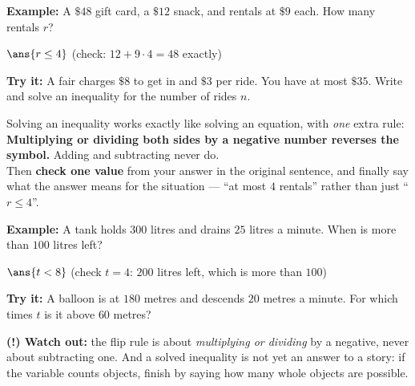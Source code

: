 \documentclass[12pt]{article}
\begin{document}
\begin{examplebox}
\textbf{Example:} \quad A $\$48$ gift card, a $\$12$ snack, and rentals at
$\$9$ each. How many rentals $r$?

$\ans{r \le 4}$ \quad (check: $12 + 9 \cdot 4 = 48$ exactly)
\end{examplebox}

\begin{tryitbox}
\textbf{Try it:} \quad A fair charges $\$8$ to get in and $\$3$ per ride. You
have at most $\$35$. Write and solve an inequality for the number of rides
$n$.\\[2pt]
\end{tryitbox}


\begin{formulabox}
Solving an inequality works exactly like solving an equation, with \emph{one}
extra rule:\\[3pt]
\textbf{Multiplying or dividing both sides by a negative number reverses the
symbol.} Adding and subtracting never do.\\[3pt]
Then \textbf{check one value} from your answer in the original sentence, and
finally say what the answer means for the situation --- ``at most $4$ rentals''
rather than just ``$r \le 4$''.
\end{formulabox}

\begin{examplebox}
\textbf{Example:} \quad A tank holds $300$ litres and drains $25$ litres a
minute. When is more than $100$ litres left?

$\ans{t < 8}$ \quad (check $t = 4$: $200$ litres left, which is more than
$100$)
\end{examplebox}

\begin{tryitbox}
\textbf{Try it:} \quad A balloon is at $180$ metres and descends $20$ metres a
minute. For which times $t$ is it above $60$ metres?\\[2pt]
\end{tryitbox}

\begin{watchoutbox}
\textbf{(!) Watch out:} the flip rule is about \emph{multiplying or dividing}
by a negative, never about subtracting one. And a solved inequality is not yet
an answer to a story: if the variable counts objects, finish by saying how many
whole objects are possible.
\end{watchoutbox}
\end{document}
